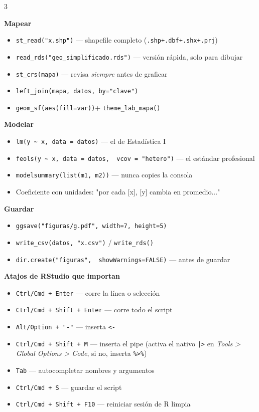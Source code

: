 \documentclass[9pt]{extarticle}
\newcommand{\tarea}[1]{%
  \par\vspace{8pt}%
  \noindent\colorbox{verdeITAM}{\parbox[c][14pt]{\dimexpr\linewidth-2\fboxsep\relax}{\hspace{2pt}\color{white}\bfseries\fontsize{9.3}{10}\selectfont #1}}%
  \par\vspace{4pt}%
}
\newcommand{\co}[1]{\texttt{\color{verdeProfundo}#1}}
\begin{document}
\begin{multicols}{3}
\tarea{Mapear}
\begin{itemize}
  \item \co{st\_read("x.shp")} --- shapefile completo (\co{.shp+.dbf+.shx+.prj})
  \item \co{read\_rds("geo\_simplificado.rds")} --- versión rápida, solo para dibujar
  \item \co{st\_crs(mapa)} --- revisa \emph{siempre} antes de graficar
  \item \co{left\_join(mapa, datos, by="clave")}
  \item \co{geom\_sf(aes(fill=var))}\newline+ \co{theme\_lab\_mapa()}
\end{itemize}

\tarea{Modelar}
\begin{itemize}
  \item \co{lm(y \~{} x, data = datos)} --- el de Estadística I
  \item \co{feols(y \~{} x, data = datos,}\newline\co{\ \ vcov = "hetero")} --- el estándar profesional
  \item \co{modelsummary(list(m1, m2))} --- nunca copies la consola
  \item Coeficiente con unidades: "por cada [x], [y] cambia en promedio..."
\end{itemize}

\tarea{Guardar}
\begin{itemize}
  \item \co{ggsave("figuras/g.pdf", width=7, height=5)}
  \item \co{write\_csv(datos, "x.csv")} / \co{write\_rds()}
  \item \co{dir.create("figuras",}\newline\co{\ \ showWarnings=FALSE)} --- antes de guardar
\end{itemize}

\columnbreak


\tarea{Atajos de RStudio que importan}
\begin{itemize}
  \item \co{Ctrl/Cmd + Enter} --- corre la línea o selección
  \item \co{Ctrl/Cmd + Shift + Enter} --- corre todo el script
  \item \co{Alt/Option + "-"} --- inserta \co{<-}
  \item \co{Ctrl/Cmd + Shift + M} --- inserta el pipe (activa el nativo \co{|>} en \emph{Tools > Global Options > Code}, si no, inserta \co{\%>\%})
  \item \co{Tab} --- autocompletar nombres y argumentos
  \item \co{Ctrl/Cmd + S} --- guardar el script
  \item \co{Ctrl/Cmd + Shift + F10} --- reiniciar sesión de R limpia
\end{itemize}


\end{multicols}
\end{document}
